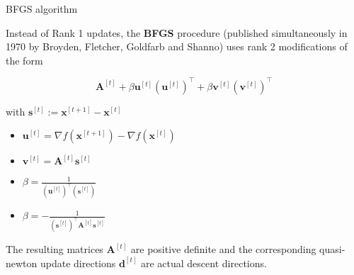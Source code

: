 \documentclass[11pt,compress,t,notes=noshow, xcolor=table]{beamer}
\begin{document}
\begin{vbframe}{BFGS algorithm}

Instead of Rank 1 updates, the \textbf{BFGS} procedure (published simultaneously in 1970 by Broyden, Fletcher, Goldfarb and Shanno) uses rank 2 modifications of the form

$$
\bm{A}^{[t]} + \beta \bm{u}^{[t]}(\bm{u}^{[t]})^{\top} + \beta \bm{v}^{[t]}(\bm{v}^{[t]})^{\top}
$$

with $\bm{s}^{[t]} := \bm{x}^{[t+1]} - \bm{x}^{[t]}$

\begin{itemize}
  \item $\bm{u}^{[t]} = \nabla f(\bm{x}^{[t+1]}) - \nabla f(\bm{x}^{[t]})$
  \item $\bm{v}^{[t]} = \bm{A}^{[t]} \bm{s}^{[t]}$
  \item $\beta = \frac{1}{(\bm{u}^{[t]})^\top (\bm{s}^{[t]})}$
  \item $\beta = - \frac{1}{(\bm{s}^{[t]})^\top \bm{A}^{[t]} \bm{s}^{[t]}}$
\end{itemize}

The resulting matrices $\bm{A}^{[t]}$ are positive definite and the corresponding quasi-newton update directions $\bm{d}^{[t]}$ are actual descent directions.



\end{vbframe}


\endlecture
\end{document}
